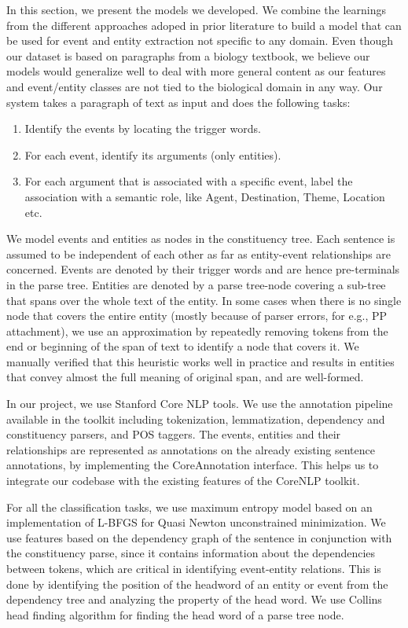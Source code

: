 In this section, we present the models we developed. We combine the learnings from the different approaches adoped in prior literature to build a model that can be used for event and entity extraction not specific to any domain. Even though our dataset is based on paragraphs from a biology textbook, we believe our models would generalize well to deal with more general content as our features and event/entity classes are not tied to the biological domain in any way. Our system takes a paragraph of text as input and does the following tasks:

\begin{enumerate}
\item Identify the events by locating the trigger words.
\item For each event, identify its arguments (only entities).
\item For each argument that is associated with a specific event, label the association with a semantic role, like Agent, Destination, Theme, Location etc.
\end{enumerate}

We model events and entities as nodes in the constituency tree. Each sentence is assumed to be independent of each other as far as entity-event relationships are concerned. Events are denoted by their trigger words and are hence pre-terminals in the parse tree. Entities are denoted by a parse tree-node covering a sub-tree that spans over the whole text of the entity. In some cases when there is no single node that covers the entire entity (mostly because of parser errors, for e.g., PP attachment), we use an approximation by repeatedly removing tokens from the end or beginning of the span of text to identify a node that covers it. We manually verified that this heuristic works well in practice and results in entities that convey almost the full meaning of original span, and are well-formed.

In our project, we use Stanford Core NLP tools. We use the annotation pipeline available in the toolkit including tokenization, lemmatization, dependency and constituency parsers, and POS taggers. The events, entities and their relationships are represented as annotations on the already existing sentence annotations, by implementing the CoreAnnotation interface. This helps us to integrate our codebase with the existing features of the CoreNLP toolkit.

For all the classification tasks, we use maximum entropy model based on an implementation of L-BFGS for Quasi Newton unconstrained minimization. We use features based on the dependency graph of the sentence in conjunction with the constituency parse, since it contains information about the dependencies between tokens, which are critical in identifying event-entity relations. This is done by identifying the position of the headword of an entity or event from the dependency tree and analyzing the property of the head word. We use Collins head finding algorithm for finding the head word of a parse tree node. 

